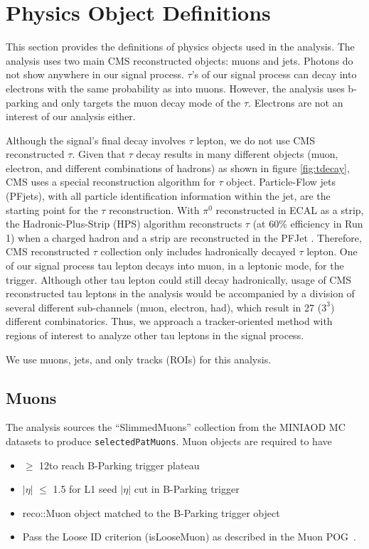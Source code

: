 \clearpage
\chapter{Physics Object Definitions}\label{sec:objects}

This section provides the definitions of physics objects used in the analysis.
The analysis uses two main CMS reconstructed objects: muons and jets.
Photons do not show anywhere in our signal process.
$\tau$'s of our signal process can decay into electrons with the same probability as into muons.
However, the analysis uses b-parking and only targets the muon decay mode of the $\tau$.
Electrons are not an interest of our analysis either.

Although the signal's final decay involves $\tau$ lepton, we do not use CMS reconstructed $\tau$.
Given that $\tau$ decay results in many different objects (muon, electron, and different combinations of hadrons) as shown in figure \ref{fig:tdecay}, CMS uses a special reconstruction algorithm for $\tau$ object.
Particle-Flow jets (PFjets), with all particle identification information within the jet, are the starting point for the $\tau$ reconstruction.
With $\pi^{0}$ reconstructed in ECAL as a strip, the Hadronic-Plus-Strip (HPS) algorithm reconstructs $\tau$ (at 60\% efficiency in Run 1) when a charged hadron and a strip are reconstructed in the PFJet \cite{HPS}.
Therefore, CMS reconstructed $\tau$ collection only includes hadronically decayed $\tau$ lepton.
One of our signal process tau lepton decays into muon, in a leptonic mode, for the trigger.
Although other tau lepton could still decay hadronically, usage of CMS reconstructed tau leptons in the analysis would be accompanied by a division of several different sub-channels (muon, electron, had), which result in 27 ($3^{3}$) different combinatorics.
Thus, we approach a tracker-oriented method with regions of interest to analyze other tau leptons in the signal process.

We use muons, jets, and only tracks (ROIs) for this analysis.
\section{Muons}\label{sec:muons}
The analysis sources the ``SlimmedMuons'' collection from the MINIAOD MC datasets to produce {\tt selectedPatMuons}.
Muon objects are required to have 
\begin{itemize}
  \item \pt $\geq$ 12\GeV to reach B-Parking trigger plateau
  \item $|\eta|$ $\leq$ 1.5 for L1 seed $|\eta|$ cut in B-Parking trigger
  \item reco::Muon object matched to the B-Parking trigger object
  \item Pass the Loose ID criterion (isLooseMuon) as described in the Muon POG~\cite{muonpog}.
\end{itemize}

